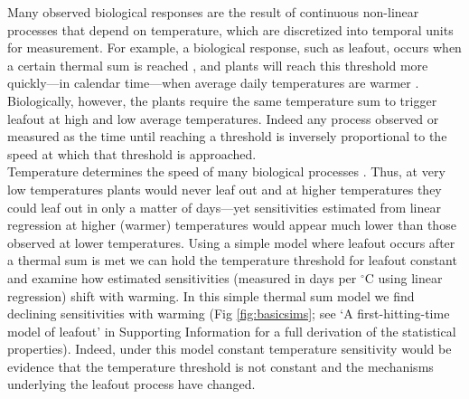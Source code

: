 \documentclass[11pt,letter]{article}
\begin{document}
Many observed biological responses are the result of continuous non-linear processes that depend on temperature, which are discretized into temporal units for measurement. For example, a biological response, such as leafout, occurs when a certain thermal sum is reached \citep{dij1956,lindsey1956}, and plants will reach this threshold more quickly---in calendar time---when average daily temperatures are warmer \citep[Fig. \ref{fig:ospreewsims},][]{kramer2012book}. 
Biologically, however, the plants require the same temperature sum to trigger leafout at high and low average temperatures. Indeed any process observed or measured as the time until reaching a threshold is inversely proportional to the speed at which that threshold is approached. \\ %

Temperature determines the speed of many biological processes \citep{bonan1992,hofmann2010}. Thus, at very low temperatures plants would never leaf out and at higher temperatures they could leaf out in only a matter of days---yet sensitivities estimated from linear regression at higher (warmer) temperatures would appear much lower than those observed at lower temperatures. Using a simple model where leafout occurs after a thermal sum is met we can hold the temperature threshold for leafout constant \citep{Hunter:1992jw,zohner2020gcb} and examine how estimated sensitivities (measured in days per $^{\circ}$C using linear regression) shift with warming. In this simple thermal sum model \citep[which we argue is the null model for studies of biological events across different temperatures, Fig. \ref{fig:ospreewsims} and][]{dij1956,lindsey1956,zohner2020gcb} we find declining sensitivities with warming (Fig \ref{fig:basicsims}; see `A first-hitting-time model of leafout' in Supporting Information for a full derivation of the statistical properties). Indeed, under this model constant temperature sensitivity would be evidence that the temperature threshold is not constant and the mechanisms underlying the leafout process have changed. \\
\end{document}

